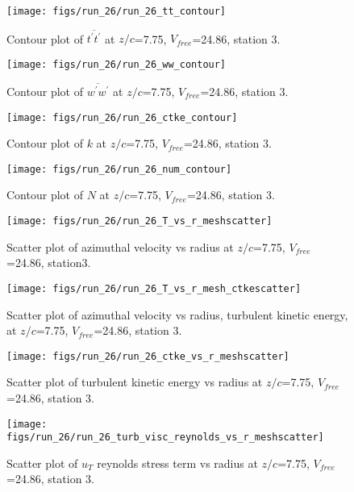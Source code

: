 \begin{figure}[H]
\centering
\texttt{[image: figs/run\_26/run\_26\_tt\_contour]}
\caption{Contour plot of $\overline{t^\prime t^\prime}$ at $z/c$=7.75, $V_{free}$=24.86, station 3.}
\end{figure}


\begin{figure}[H]
\centering
\texttt{[image: figs/run\_26/run\_26\_ww\_contour]}
\caption{Contour plot of $\overline{w^\prime w^\prime}$ at $z/c$=7.75, $V_{free}$=24.86, station 3.}
\end{figure}


\begin{figure}[H]
\centering
\texttt{[image: figs/run\_26/run\_26\_ctke\_contour]}
\caption{Contour plot of $k$ at $z/c$=7.75, $V_{free}$=24.86, station 3.}
\end{figure}


\begin{figure}[H]
\centering
\texttt{[image: figs/run\_26/run\_26\_num\_contour]}
\caption{Contour plot of $N$ at $z/c$=7.75, $V_{free}$=24.86, station 3.}
\end{figure}


\begin{figure}[H]
\centering
\texttt{[image: figs/run\_26/run\_26\_T\_vs\_r\_meshscatter]}
\caption{Scatter plot of azimuthal velocity vs radius at $z/c$=7.75, $V_{free}$=24.86, station3.}
\end{figure}


\begin{figure}[H]
\centering
\texttt{[image: figs/run\_26/run\_26\_T\_vs\_r\_mesh\_ctkescatter]}
\caption{Scatter plot of azimuthal velocity vs radius, turbulent kinetic energy, at $z/c$=7.75, $V_{free}$=24.86, station 3.}
\end{figure}


\begin{figure}[H]
\centering
\texttt{[image: figs/run\_26/run\_26\_ctke\_vs\_r\_meshscatter]}
\caption{Scatter plot of turbulent kinetic energy vs radius at $z/c$=7.75, $V_{free}$=24.86, station 3.}
\end{figure}


\begin{figure}[H]
\centering
\texttt{[image: figs/run\_26/run\_26\_turb\_visc\_reynolds\_vs\_r\_meshscatter]}
\caption{Scatter plot of $
u_T$ reynolds stress term vs radius at $z/c$=7.75, $V_{free}$=24.86, station 3.}
\end{figure}



